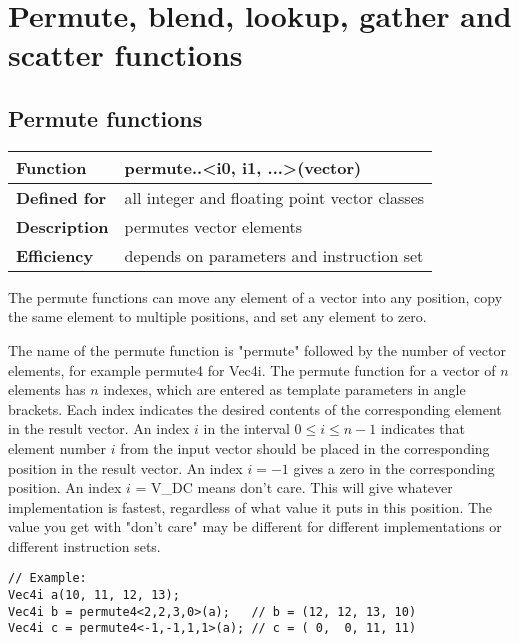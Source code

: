 \documentclass[vcl_manual.tex]{subfiles}
\begin{document}
\chapter{Permute, blend, lookup, gather and scatter functions}\label{chap:PermuteBlendEtc}

\section{Permute functions}\label{PermuteFunctions}
\flushleft

\begin{tabular}{|p{30mm}|p{120mm}|}
\hline
\bfseries Function & permute..\textless i0, i1, ...\textgreater(vector) \\ \hline
\bfseries Defined for & all integer and floating point vector classes \\ \hline
\bfseries Description & permutes vector elements \\ \hline
\bfseries Efficiency & depends on parameters and instruction set \\ \hline
\end{tabular}

The permute functions can move any element of a vector into any position, copy the same element to multiple positions, and set any element to zero.

The name of the permute function is "permute" followed by the number of vector elements, for example permute4 for Vec4i. The permute function for a vector of $n$ elements has $n$ indexes, which are entered as template parameters in angle brackets. Each index indicates the desired contents of the corresponding element in the result vector. An index $i$ in the interval
$0 \leq i \leq n-1$ indicates that element number $i$ from the input vector should be placed in the corresponding position in the result vector. An index $i = -1$ gives a zero in the corresponding position. An index $i$ = V\_DC means don't care. This will give whatever implementation is fastest, regardless of what value it puts in this position. The value you get with "don't care" may be different for different implementations or different instruction sets.

\begin{lstlisting}[frame=none]
// Example:
Vec4i a(10, 11, 12, 13);
Vec4i b = permute4<2,2,3,0>(a);   // b = (12, 12, 13, 10)
Vec4i c = permute4<-1,-1,1,1>(a); // c = ( 0,  0, 11, 11)
\end{lstlisting}
\end{document}
